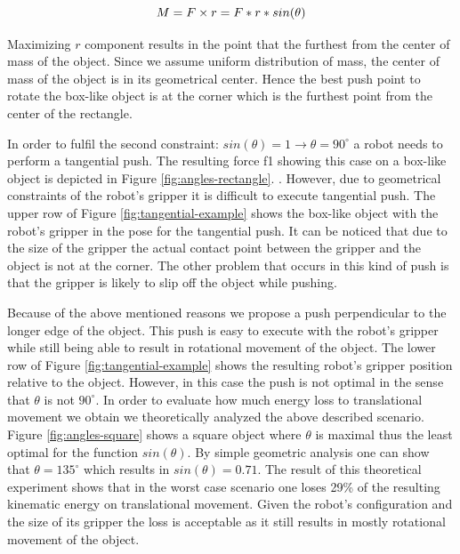 \begin{equation}
M =  F \times r = F*r*sin(\theta)\\
\label{eq:max-torque}
\end{equation}

Maximizing $r$ component results in the point that the furthest from the center of mass of the object. Since we assume uniform distribution of mass, the center of mass of the object is in its geometrical center. Hence the best push point to rotate the box-like object is at the corner which is the furthest point from the center of the rectangle.

In order to fulfil the second constraint: $sin(\theta) = 1 \to \theta = 90 ^\circ$ a robot needs to perform a tangential push. The resulting force f1 showing this case on a box-like object is depicted in Figure \ref{fig:angles-rectangle}. . However, due to geometrical constraints of the robot's gripper it is difficult to execute tangential push. The upper row of Figure \ref{fig:tangential-example} shows the box-like object with the robot's gripper in the pose for the tangential push. It can be noticed that due to the size of the gripper the actual contact point between the gripper and the object is not at the corner. The other problem that occurs in this kind of push is that the gripper is likely to slip off the object while pushing.

Because of the above mentioned reasons we propose a push perpendicular to the longer edge of the object. This push is easy to execute with the robot's gripper while still being able to result in rotational movement of the object. The lower row of Figure \ref{fig:tangential-example} shows the resulting robot's gripper position relative to the object. However, in this case the push is not optimal in the sense that $\theta$ is not $90 ^\circ$. In order to evaluate how much energy loss to translational movement we obtain we theoretically analyzed the above described scenario. Figure \ref{fig:angles-square} shows a square object where $\theta$ is maximal thus the least optimal for the function $sin(\theta)$. By simple geometric analysis one can show that $\theta =135 ^\circ$ which results in $sin(\theta) = 0.71$. The result of this theoretical experiment shows that in the worst case scenario one loses 29\% of the resulting kinematic energy on translational movement. Given the robot's configuration and the size of its gripper the loss is acceptable as it still results in mostly rotational movement of the object. 








